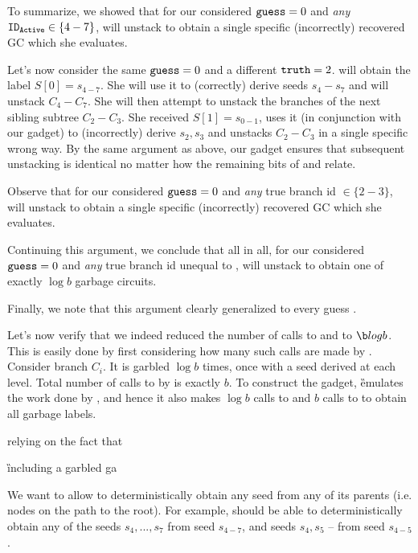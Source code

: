 To summarize, we showed that for our considered $\mathtt{guess}=0$ and {\em any}  $\mathtt{ID_{Active}} \in \{4-7\}$, \E will unstack to obtain a single specific (incorrectly) recovered GC which she evaluates.

Let's now consider the same $\mathtt{guess}=0$ and a different $\mathtt{truth} = 2$.  \E will obtain the label $S[0]=s_{4-7}$.  She will use it to (correctly) derive seeds $s_4-s_7$ and will unstack $C_4-C_7$.  She will then attempt to unstack the branches of the next sibling subtree $C_2-C_3$.  She received  $S[1] = s_{0-1}$, uses it (in conjunction with our gadget) to (incorrectly) derive $s_2,s_3$ and unstacks $C_2-C_3$ in a single specific wrong way. By the same argument as above, our gadget ensures that subsequent unstacking is identical  no matter how the remaining bits of \truth and \guess relate.

Observe that for our considered $\mathtt{guess}=0$ and {\em any} true branch id $\in \{2-3\}$, \E will unstack to obtain a single specific (incorrectly) recovered GC which she evaluates.

Continuing this argument, we conclude that all in all, for our considered $\mathtt{guess}=0$ and {\em any} true branch id unequal to \guess, \E will unstack to obtain one of exactly $\log b$ garbage circuits.


Finally, we note  that this argument clearly generalized to every guess \guess.

Let's now verify that we indeed reduced the number of calls to \Gb and \Ev to $\b log b$.  This is easily done by first considering how many such calls are made by \E.  Consider branch $C_i$.  It is garbled $\log b$ times, once with a seed derived at each level.  Total number of calls to \Ev by \E is exactly $b$.  To construct the gadget, \G emulates the work done by \E, and hence it also makes  $\log b$ calls to \Gb and $b$ calls to \Ev to obtain all garbage labels.






\bigskip
 relying on the fact that

  \G including a garbled ga











We want to allow \E to deterministically obtain any seed from any of its parents (i.e. nodes on the path to the root).  For example, \E should be able to deterministically obtain any of the seeds $s_4,...,s_7$ from seed $s_{4-7}$, and seeds $s_4, s_5$ -- from seed $s_{4-5}$. 


